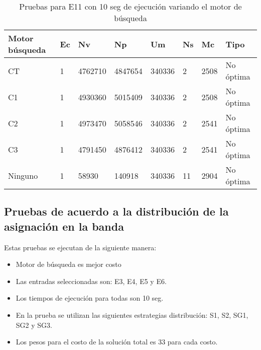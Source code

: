 \begin{center}
\begin{longtable}{|p{3cm}|p{1.0cm}|p{1.6cm}|p{1.6cm}|p{1.1cm}|p{1.1cm}|p{1.1cm}|p{2.7cm}|}
	\caption{Pruebas para E11 con 10 seg de ejecución variando el motor de búsqueda} \\
	\hline
	\cellcolor[gray]{0.9} \textbf{Motor búsqueda} & \cellcolor[gray]{0.9}\textbf{Ec} & \cellcolor[gray]{0.9}\textbf{Nv} & \cellcolor[gray]{0.9}\textbf{Np} & \cellcolor[gray]{0.9}\textbf{Um} & \cellcolor[gray]{0.9}\textbf{Ns} &  \cellcolor[gray]{0.9}\textbf{Mc} & \cellcolor[gray]{0.9}\textbf{Tipo}\\	\hline
	CT& 1 &4762710  &4847654 &340336  &2 &2508&No óptima \\
	\hline
	C1& 1 &4930360  &5015409 &340336  &2 &2508&No óptima \\
	\hline
	C2& 1 &4973470  &5058546 &340336  &2 &2541&No óptima \\
	\hline
	C3& 1 &4791450  &4876412 &340336  &2 &2541&No óptima \\
	\hline
	Ninguno& 1 &58930  &140918 &340336  &11 &2904&No óptima \\
	\hline
\end{longtable}	
\end{center}

\subsection{Pruebas de acuerdo a la distribución de la asignación en la banda}

Estas pruebas se ejecutan de la siguiente manera:

\begin{itemize}
	\item Motor de búsqueda es mejor costo
	\item Las entradas seleccionadas son: E3, E4, E5 y E6.
	\item Los tiempos de ejecución para todas son 10 seg.
	\item En la prueba se utilizan las siguientes estrategias distribución: S1, S2, SG1, SG2 y SG3.
	\item Los pesos para el costo de la solución total es 33 para cada costo.
\end{itemize}

